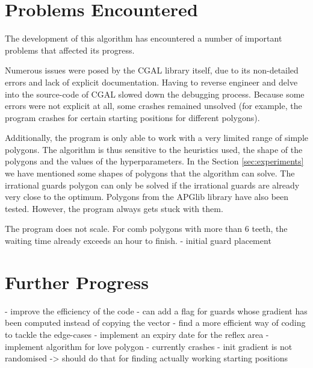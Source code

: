 \section{Problems Encountered}
The development of this algorithm has encountered a number of important problems that affected its progress.

Numerous issues were posed by the CGAL library itself, due to its non-detailed errors and lack of explicit documentation. Having to reverse engineer and delve into the source-code of CGAL slowed down the debugging process. Because some errors were not explicit at all, some crashes remained unsolved (for example, the program crashes for certain starting positions for different polygons).

Additionally, the program is only able to work with a very limited range of simple polygons. The algorithm is thus sensitive to the heuristics used, the shape of the polygons and the values of the hyperparameters. In the Section \ref{sec:experiments} we have mentioned some shapes of polygons that the algorithm can solve. 
The irrational guards polygon can only be solved if the irrational guards are already very close to the optimum. Polygons from the APGlib library \cite{art-gallery-instances-page} have also been tested. However, the program always gets stuck with them.

The program does not scale. For comb polygons with more than 6 teeth, the waiting time already exceeds an hour to finish.
- initial guard placement


\section{Further Progress}
- improve the efficiency of the code
    - can add a flag for guards whose gradient has been computed instead of copying the vector
- find a more efficient way of coding to tackle the edge-cases
- implement an expiry date for the reflex area
- implement algorithm for love polygon - currently crashes 
- init gradient is not randomised -> should do that for finding actually working starting positions